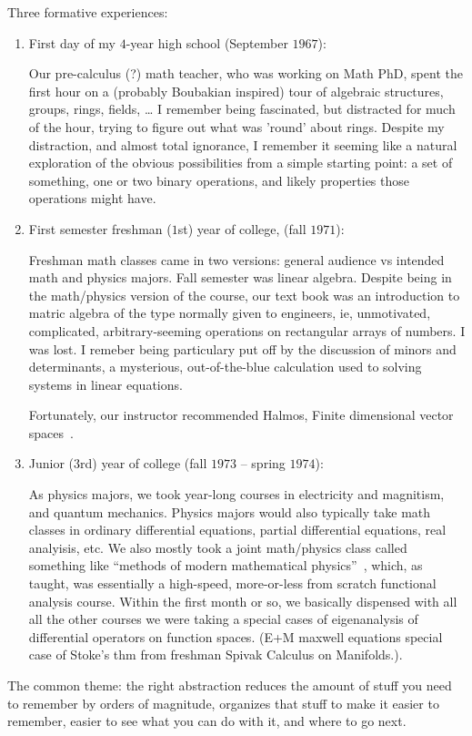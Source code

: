 \documentclass[11pt,openany]{article}
\begin{document}
Three formative experiences:
\begin{enumerate}
  \item First day of my $4$-year high school (September $1967$):
  \par
  Our pre-calculus (?) math teacher, who was working on Math PhD,
  spent the first hour on a (probably Boubakian inspired) tour 
  of algebraic structures, groups, rings, fields, \ldots
  I remember being fascinated, but distracted for much of the hour, 
  trying to figure out what was 'round' about rings.
  Despite my distraction, and almost total ignorance, 
  I remember it seeming like a natural exploration of the obvious
  possibilities from a simple starting point: a set of something,
  one or two binary operations, and likely properties those
  operations might have.
 
  \item First semester freshman ($1$st) year of college,
  (fall $1971$):
  \par
  Freshman math classes came in two versions: general audience
  vs intended math and physics majors. Fall semester was linear 
  algebra. Despite being in the math/physics version of the course,
  our text book was an introduction to matric algebra of the type
  normally given to engineers, ie, unmotivated, complicated,
  arbitrary-seeming operations on rectangular arrays of numbers.
  I was lost. I remeber being particulary put off by the 
  discussion of minors and determinants, a mysterious, 
  out-of-the-blue calculation used to solving systems in linear
  equations.
  \par
  Fortunately, our instructor recommended Halmos,
  \textsf{Finite dimensional vector spaces}~\cite{Halmos1958Finite}. 
  
  \item Junior ($3$rd) year of college 
  (fall $1973$ -- spring $1974$):
  \par
  As physics majors, we took year-long courses in 
  electricity and magnitism, and quantum mechanics.
  Physics majors would also typically take math classes in
  ordinary differential equations, partial differential equations,
  real analyisis, etc. We also mostly took a joint math/physics
  class called something like ``methods of modern mathematical 
  physics''~\cite{ReedSimon1972Functional}, 
  which, as taught, was essentially a high-speed,
  more-or-less from scratch functional analysis course.
  Within the first month or so, we basically dispensed with all
  all the other courses we were taking a special cases of 
  eigenanalysis of differential operators on function spaces.
  (E+M maxwell equations special case of Stoke's thm 
  from freshman Spivak Calculus on Manifolds.).
  
\end{enumerate}
The common theme: the right abstraction reduces 
the amount of stuff you need to remember by orders of magnitude,
organizes that stuff to make it easier to remember,
easier to see what you can do with it,
and where to go next.
\end{document}
